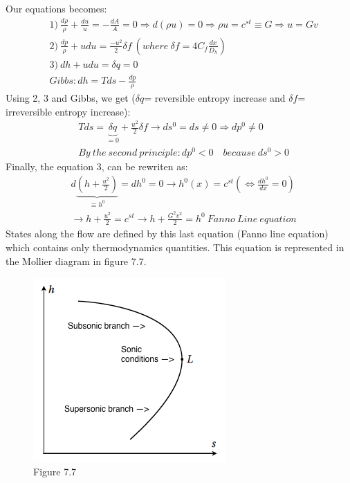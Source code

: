 Our equations becomes:
 \begin{equation}
\begin{aligned}
&1)\ \frac{d\rho}{\rho}+\frac{du}{u}=-\frac{dA}{A}=0 \Rightarrow d(\rho u)=0 \Rightarrow \rho u=c^{st} \equiv G \Rightarrow u=Gv \\
&2)\ \frac{dp}{\rho}+udu=\frac{-u^2}{2} \delta f \ (where \ \delta f =4C_f\frac{dx}{D_h} ) \\
&3)\ dh+udu=\delta q=0 \\
& Gibbs: dh=Tds-\frac{dp}{\rho}
\end{aligned} 
\end{equation}
Using 2, 3 and Gibbs, we get ($\delta q$= reversible entropy increase and $\delta f$= irreversible entropy increase):
 \begin{equation}
\begin{aligned}
&Tds=\underbrace{\delta q}_{=0}+\frac{u^2}{2}\delta f \rightarrow ds^0=ds \neq 0 \Rightarrow dp^0 \neq 0 \\
&By\ the\ second\ principle: dp^0<0\quad because\ ds^0>0
\end{aligned} 
\end{equation}
Finally, the equation 3, can be rewriten as:
 \begin{equation}
\begin{aligned}
&d \underbrace{(h+\frac{u^2}{2})}_{\equiv h^0}=dh^0=0 \rightarrow h^0(x)=c^{st} (\Leftrightarrow \frac{dh^0}{dx}=0) \\
& \rightarrow h+\frac{u^2}{2}=c^{st} \rightarrow h+\frac{G^2v^2}{2}=h^0 \ Fanno\ Line\ equation
\end{aligned} 
\end{equation}
States along the flow are defined by this last equation (Fanno line equation) which contains only thermodynamics quantities. This equation is represented in the Mollier diagram in figure 7.7.

\begin{figure}[H]
\begin{center}
\includegraphics[scale=0.45]{ch7/chap77.png}
\caption*{Figure 7.7}
\end{center}
\end{figure}

